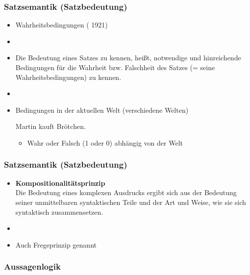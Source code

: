 \begin{frame}
\frametitle{Satzsemantik (Satzbedeutung)}

\begin{itemize}
	\item Wahrheitsbedingungen (\citeauthor{Wittgenstein72a-u} 1921)
	\item[]
	\item Die Bedeutung eines Satzes zu kennen, heißt, notwendige und hinreichende Bedingungen für die Wahrheit bzw. Falschheit des Satzes (= seine Wahrheitsbedingungen) zu kennen.
	\item[]
	\item Bedingungen in der aktuellen Welt (verschiedene Welten)
	
	
		\ea Martin kauft Brötchen.
		\z
		
	\begin{itemize}	
		\item Wahr oder Falsch (1 oder 0) \ras abhängig von der Welt
	\end{itemize}
	
\end{itemize}

\end{frame}



\begin{frame}
\frametitle{Satzsemantik (Satzbedeutung)}

\begin{itemize}
	\item \textbf{Kompositionalitätsprinzip}\\
Die Bedeutung eines komplexen Ausdrucks ergibt sich aus der Bedeutung seiner unmittelbaren syntaktischen Teile und der Art und Weise, wie sie sich syntaktisch zusammensetzen.
	\item[]
	\item Auch Fregeprinzip genannt
\end{itemize}

\end{frame}


%
\subsubsection{Aussagenlogik}


